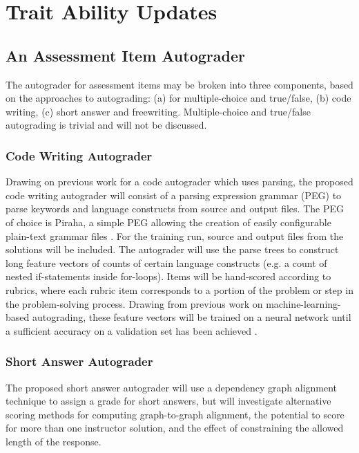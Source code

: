 \section{Trait Ability Updates}

\subsection{An Assessment Item Autograder}

The autograder for assessment items may be broken into three components, based
on the approaches to autograding: (a) for multiple-choice and true/false, (b)
code writing, (c) short answer and freewriting.  Multiple-choice and true/false
autograding is trivial and will not be discussed. 

\subsubsection{Code Writing Autograder}

Drawing on previous work for a code autograder which uses parsing, the proposed
code writing autograder will consist of a parsing expression grammar (PEG) to
parse keywords and language constructs from source and output files.  The PEG
of choice is Piraha, a simple PEG allowing the creation of easily configurable
plain-text grammar files \cite{brandt2010}.  For the training run, source and output files from
the solutions will be included.  The autograder will use the parse trees to
construct long feature vectors of counts of certain language constructs (e.g. a
count of nested if-statements inside for-loops).  Items will be hand-scored
according to rubrics, where each rubric item corresponds to a portion of the
problem or step in the problem-solving process.  Drawing from previous
work on machine-learning-based autograding, these feature vectors will be
trained on a neural network until a sufficient accuracy on a validation set has
been achieved \cite{shashank2014}. 

\subsubsection{Short Answer Autograder}

The proposed short answer autograder will use a dependency graph alignment
technique \cite{mohler2011} to assign a grade for short answers, but will
investigate alternative scoring methods for computing graph-to-graph alignment,
the potential to score for more than one instructor solution, and the effect of
constraining the allowed length of the response.



